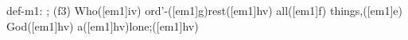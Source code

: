 def-m1: \grealign;
(f3) Who([em1]iv) ord'-([em1]g)rest([em1]hv) all([em1]f) things,([em1]e) God([em1]hv) a([em1]hv)lone;([em1]hv)